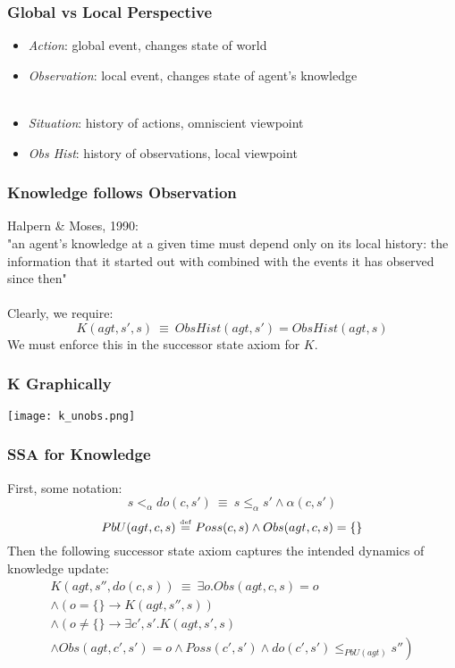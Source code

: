 \documentclass{beamer}
\newcommand{\isdef}{\hbox{$\stackrel{\mbox{\tiny def}}{=}$}}
\begin{document}
\begin{frame}
\frametitle{Global vs Local Perspective}
\begin{itemize}
\item \emph{Action}: global event, changes state of world
\item \emph{Observation}: local event, changes state of agent's knowledge\\
\ \\
\item \emph{Situation}: history of actions, omniscient viewpoint
\item \emph{Obs Hist}: history of observations, local viewpoint
\end{itemize}
\end{frame}

\begin{frame}
\frametitle{Knowledge follows  Observation}
Halpern \& Moses, 1990:\\
"an agent's knowledge at a given time must depend only on its local history:
the information that it started out with combined with the events it has
observed since then"
\pause
\ \\
\ \\
Clearly, we require:
\begin{equation*}
K(agt,s',s)\ \equiv\ ObsHist(agt,s') = ObsHist(agt,s)
\end{equation*}
We must enforce this in the successor state axiom for $K$.
\end{frame}

\begin{frame}
\frametitle{K Graphically}
\begin{center}
  \texttt{[image: k\_unobs.png]}
\end{center}
\end{frame}

\begin{frame}
\frametitle{SSA for Knowledge}
First, some notation:
\begin{equation*}
  s <_{\alpha} do(c,s')\ \equiv\ s \leq_{\alpha} s' \wedge \alpha(c,s')
\end{equation*}
\begin{equation*}
  PbU(agt,c,s)\ \isdef\ Poss(c,s) \wedge Obs(agt,c,s) = \{\}
\end{equation*}
\pause
Then the following successor state axiom captures the intended dynamics of
knowledge update:
\begin{multline*}
  K(agt,s'',do(c,s))\ \equiv\ \exists o . Obs(agt,c,s) = o  \\
  \wedge \left(o = \{\} \rightarrow K(agt,s'',s)\right) \\
  \wedge \left(o \neq \{\} \rightarrow \exists c',s' . K(agt,s',s)\right. \\
  \left.\wedge Obs(agt,c',s') = o \wedge Poss(c',s') \wedge do(c',s') \leq_{PbU(agt)} s''\right)
\end{multline*}
\end{frame}
\end{document}

